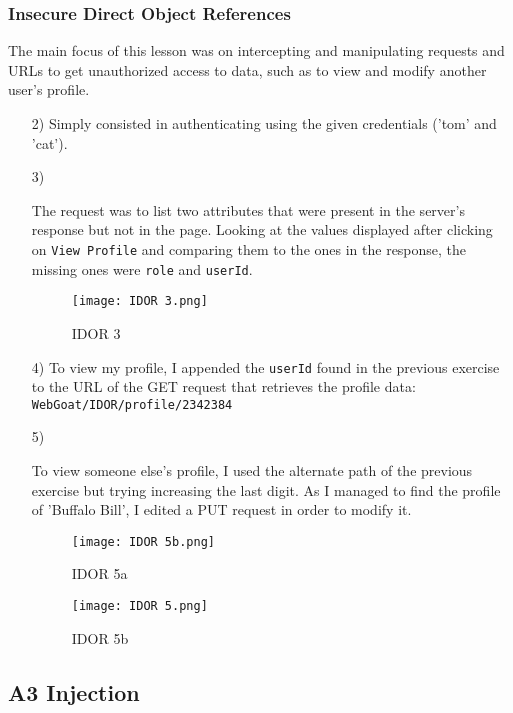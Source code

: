 \documentclass{article}
\begin{document}
\subsubsection{Insecure Direct Object References}
The main focus of this lesson was on intercepting and manipulating requests and URLs to get unauthorized access to data, such as to view and modify another user's profile.
\begin{itemize}
    \item[2)] {Simply consisted in authenticating using the given credentials ('tom' and 'cat').}
    
    \item[3)] {The request was to list two attributes that were present in the server's response but not in the page.
    Looking at the values displayed after clicking on \texttt{View Profile} and comparing them to the ones in the response, the missing ones were \texttt{role} and \texttt{userId}.
    \begin{figure}[H]
        \centering
        \texttt{[image: IDOR 3.png]}
        \caption{IDOR 3}
        \label{fig:idor_3}
    \end{figure}
    }
    
    \item[4)] {To view my profile, I appended the \texttt{userId} found in the previous exercise to the URL of the GET request that retrieves the profile data: \texttt{WebGoat/IDOR/profile/2342384}}
    
    \item[5)] {To view someone else's profile, I used the alternate path of the previous exercise but trying increasing the last digit.
    As I managed to find the profile of 'Buffalo Bill', I edited a PUT request in order to modify it.
    \begin{figure}[H]
        \centering
        \texttt{[image: IDOR 5b.png]}
        \caption{IDOR 5a}
        \label{fig:IDOR 5a}
    \end{figure}
    \begin{figure}[H]
        \centering
        \texttt{[image: IDOR 5.png]}
        \caption{IDOR 5b}
        \label{fig:IDOR 5b}
    \end{figure}
    }
\end{itemize}

\subsection{A3 Injection}
\end{document}
